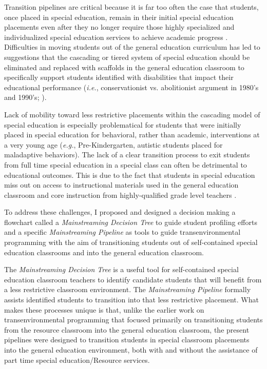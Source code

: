 \documentclass[twoside]{article}
\begin{document}
%
Transition pipelines are critical because it is far too often the case that students, once placed in special education, remain in their initial special education placements even after they no longer require those highly specialized and individualized special education services to achieve academic progress \parencite{klotz2005new,johnson2005key,anderson1987consistency,conway1988mainstreaming,fuchs1992case}. Difficulties in moving students out of the general education curriculum has led to suggestions that the cascading or tiered system of special education should be eliminated and replaced with scaffolds in the general education classroom to specifically support students identified with disabilities that impact their educational performance (\textit{i.e.}, conservationist vs. abolitionist argument in 1980's and 1990's; \parencite{fuchs1994classroom,zigmond1995concluding,anderson1987consistency,conway1988mainstreaming}). 

Lack of mobility toward less restrictive placements within the cascading model of special education is especially problematical for students that were initially placed in special education for behavioral, rather than academic, interventions at a very young age (\textit{e.g.}, Pre-Kindergarten, autistic students placed for maladaptive behaviors). The lack of a clear transition process to exit students from full time special education in a special class can often be detrimental to educational outcomes. This is due to the fact that students in special education miss out on access to instructional materials used in the general education classroom and core instruction from highly-qualified grade level teachers \parencite{gersten2006rti,brownell2010special,zigmond1995concluding,fuchs1992case}.

To address these challenges, I proposed and designed a decision making a flowchart called a \textit{Mainstreaming Decision Tree} to guide student profiling efforts and a specific \textit{Mainstreaming Pipeline} as tools to guide transenvironmental programming with the aim of transitioning students out of self-contained special education classrooms and into the general education classroom. 

The \textit{Mainstreaming Decision Tree} is a useful tool for self-contained special education classroom teachers to identify candidate students that will benefit from a less restrictive classroom environment. The \textit{Mainstreaming Pipeline} formally assists identified students to transition into that less restrictive placement. What makes these processes unique is that, unlike the earlier work on transenvironmental programming that focused primarily on transitioning students from the resource classroom into the general education classroom, the present pipelines were designed to transition students in special classroom placements into the general education environment, both with and without the assistance of part time special education/Resource services. 
\end{document}
